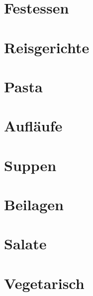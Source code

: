 \documentclass[11pt, DIV=15, twoside=false]{scrbook}
\begin{document}
\newcommand\x{1} %

\tableofcontents

\part{Festessen}






\part{Reisgerichte}




\part{Pasta}


\part{Aufläufe}





\part{Suppen}



\part{Beilagen}


\part{Salate}


\part{Vegetarisch}



\end{document}
